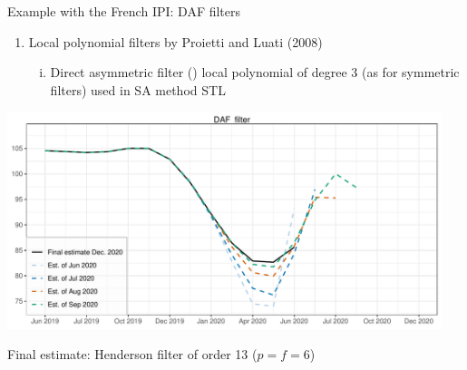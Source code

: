 \documentclass[10pt,xcolor=table,color={dvipsnames,usenames},ignorenonframetext,usepdftitle=false,english]{beamer}
\providecommand{\tightlist}{%
  \setlength{\parskip}{0pt}
  }
\newcommand\1{\mathds{1}}
\begin{document}
\begin{frame}{Example with the French IPI: DAF filters}
\protect\hypertarget{example-with-the-french-ipi-daf-filters}{}
\footnotesize

\begin{enumerate}
\item
  Local polynomial filters by Proietti and Luati (2008)

  \begin{enumerate}
  [i.]
  \tightlist
  \item
    Direct asymmetric filter () local polynomial of
    degree 3 (as for symmetric filters) \faArrowCircleRight{} used in SA
    method STL
  \end{enumerate}
\end{enumerate}

\includegraphics[width=0.95\textwidth,height=\textheight]{img/illustration_slides_1.pdf}

Final estimate: Henderson filter of order 13 (\(p=f=6\))
\end{frame}
\end{document}
